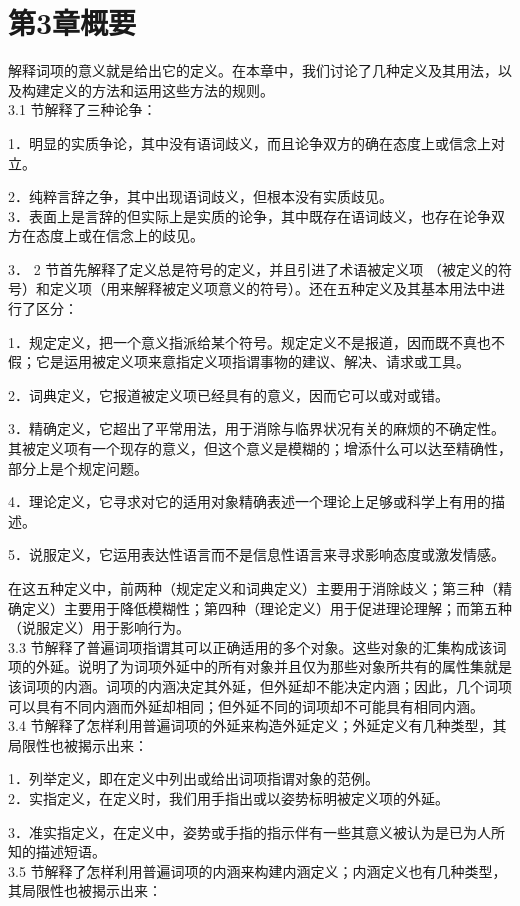 \section*{第3章概要}
解释词项的意义就是给出它的定义。在本章中，我们讨论了几种定义及其用法，以及构建定义的方法和运用这些方法的规则。\\
3.1 节解释了三种论争：

1．明显的实质争论，其中没有语词歧义，而且论争双方的确在态度上或信念上对立。

2．纯粹言辞之争，其中出现语词歧义，但根本没有实质歧见。\\
3．表面上是言辞的但实际上是实质的论争，其中既存在语词歧义，也存在论争双方在态度上或在信念上的歧见。

3． 2 节首先解释了定义总是符号的定义，并且引进了术语被定义项 （被定义的符号）和定义项（用来解释被定义项意义的符号）。还在五种定义及其基本用法中进行了区分：

1．规定定义，把一个意义指派给某个符号。规定定义不是报道，因而既不真也不假；它是运用被定义项来意指定义项指谓事物的建议、解决、请求或工具。

2．词典定义，它报道被定义项已经具有的意义，因而它可以或对或错。

3．精确定义，它超出了平常用法，用于消除与临界状况有关的麻烦的不确定性。其被定义项有一个现存的意义，但这个意义是模糊的；增添什么可以达至精确性，部分上是个规定问题。

4．理论定义，它寻求对它的适用对象精确表述一个理论上足够或科学上有用的描述。

5．说服定义，它运用表达性语言而不是信息性语言来寻求影响态度或激发情感。

在这五种定义中，前两种（规定定义和词典定义）主要用于消除歧义；第三种（精确定义）主要用于降低模糊性；第四种（理论定义）用于促进理论理解；而第五种（说服定义）用于影响行为。\\
3.3 节解释了普遍词项指谓其可以正确适用的多个对象。这些对象的汇集构成该词项的外延。说明了为词项外延中的所有对象并且仅为那些对象所共有的属性集就是该词项的内涵。词项的内涵决定其外延，但外延却不能决定内涵；因此，几个词项可以具有不同内涵而外延却相同；但外延不同的词项却不可能具有相同内涵。\\
3.4 节解释了怎样利用普遍词项的外延来构造外延定义；外延定义有几种类型，其局限性也被揭示出来：

1．列举定义，即在定义中列出或给出词项指谓对象的范例。\\
2．实指定义，在定义时，我们用手指出或以姿势标明被定义项的外延。

3．准实指定义，在定义中，姿势或手指的指示伴有一些其意义被认为是已为人所知的描述短语。\\
3.5 节解释了怎样利用普遍词项的内涵来构建内涵定义；内涵定义也有几种类型，其局限性也被揭示出来：

